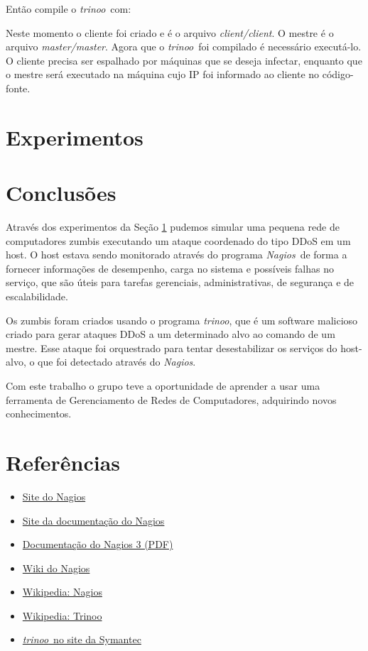 \documentclass[10pt,a4paper]{article}
\newcommand{\Nagios}{\textit{Nagios}}
\newcommand{\trinoo}{\textit{trinoo}}
\newcommand{\cbox}[1]
{
	\setlength\fboxrule{1pt}
	\begin{alltt}\fbox{#1}\end{alltt}
	\setlength\fboxrule{0.5pt}
}
\begin{document}
Então compile o \trinoo\ com:

\cbox{\$\ make -s}

Neste momento o cliente foi criado e é o arquivo \emph{client/client}. O mestre é o arquivo
\emph{master/master}. Agora que o \trinoo\ foi compilado é necessário executá-lo. O cliente
precisa ser espalhado por máquinas que se deseja infectar, enquanto que o mestre será executado
na máquina cujo IP foi informado ao cliente no código-fonte.


\section{Experimentos}\label{sec:experimentos}



\section{Conclusões}

Através dos experimentos da Seção \ref{sec:experimentos} pudemos simular uma pequena rede de
computadores zumbis executando um ataque coordenado do tipo DDoS em um host. O host estava sendo
monitorado através do programa \Nagios\ de forma a fornecer informações de desempenho, carga no
sistema e possíveis falhas no serviço, que são úteis para tarefas gerenciais, administrativas,
de segurança e de escalabilidade.

Os zumbis foram criados usando o programa \trinoo, que é um software malicioso criado para gerar
ataques DDoS a um determinado alvo ao comando de um mestre. Esse ataque foi orquestrado para
tentar desestabilizar os serviços do host-alvo, o que foi detectado através do \Nagios.

Com este trabalho o grupo teve a oportunidade de aprender a usar uma ferramenta de Gerenciamento
de Redes de Computadores, adquirindo novos conhecimentos.


\section{Referências}

\begin{itemize}
	\item \href{http://www.nagios.org/}{Site do Nagios}
	\item \href{http://www.nagios.org/documentation/}{Site da documentação do Nagios}
	\item \href{http://nagios.sourceforge.net/docs/nagios-3.pdf}{Documentação do Nagios 3 (PDF)}
	\item \href{http://wiki.nagios.org/index.php/Main\_Page}{Wiki do Nagios}
	\item \href{http://en.wikipedia.org/wiki/Nagios}{Wikipedia: Nagios}
	\item \href{http://en.wikipedia.org/wiki/Trinoo}{Wikipedia: Trinoo}
	\item \href{http://service1.symantec.com/sarc/sarc.nsf/html/W32.DoS.Trinoo.html}{\trinoo\ no site da Symantec}
\end{itemize}
\end{document}
